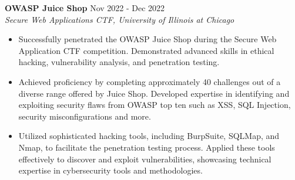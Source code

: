 
\noindent
\textbf{OWASP Juice Shop} \hfill Nov 2022 - Dec 2022 \\
\textit{Secure Web Applications CTF, University of Illinois at Chicago}
\begin{itemize}[noitemsep,topsep=0pt]
    \item Successfully penetrated the OWASP Juice Shop during the Secure Web Application CTF competition. Demonstrated advanced skills in ethical hacking, vulnerability analysis, and penetration testing.
    \item Achieved proficiency by completing approximately 40 challenges out of a diverse range offered by Juice Shop. Developed expertise in identifying and exploiting security flaws from OWASP top ten such as XSS, SQL Injection, security misconfigurations and more.
    \item Utilized sophisticated hacking tools, including BurpSuite, SQLMap, and Nmap, to facilitate the penetration testing process. Applied these tools effectively to discover and exploit vulnerabilities, showcasing technical expertise in cybersecurity tools and methodologies.
\end{itemize}

\vspace{4pt}

